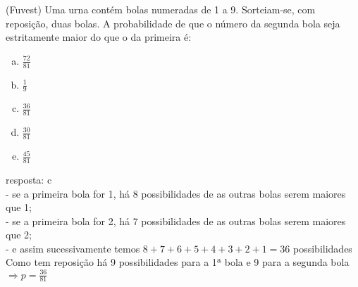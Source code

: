 \begin{ex}
 	(Fuvest) Uma urna contém bolas numeradas de 1 a 9. Sorteiam-se, com reposição, duas bolas. A probabilidade de que o número da segunda bola seja estritamente maior do que o da primeira é:
    \begin{enumerate}[(a)]
    \item $\frac{72}{81}$
    \item $\frac{1}{9}$
    \item $\frac{36}{81}$
    \item $\frac{30}{81}$
    \item $\frac{45}{81}$
    \end{enumerate}
      \begin{sol}
        resposta: c \\
        - se a primeira bola for 1, há 8 possibilidades de as outras bolas serem maiores que 1;\\
        - se a primeira bola for 2, há 7 possibilidades de as outras bolas serem maiores que 2;\\
        - e assim sucessivamente temos $8+7+6+5+4+3+2+1 =36$ possibilidades \\
        Como tem reposição há 9 possibilidades para a 1ª bola e 9 para a segunda bola\\
        $\Longrightarrow p=\frac{36}{81}$
      \end{sol}
    
\end{ex}